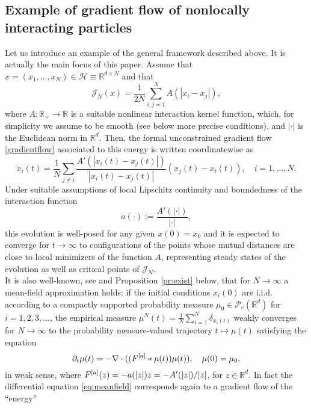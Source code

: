 \subsection{Example of gradient flow of nonlocally interacting particles}\label{sec:gradflow}
Let us introduce an example of the general framework described above. It is actually the main focus of this paper.
Assume that $x=(x_1,\dots,x_N) \in \mathcal H \equiv  \mathbb R^{d\times N}$ and that 
$$
\mathcal J_N(x) = \frac{1}{2N} \sum_{i,j=1}^N A(| x_i -  x_j |),
$$
where $A:\mathbb R_+ \to \mathbb R$ is a suitable nonlinear interaction kernel function, which, for simplicity we assume to be smooth (see below more precise conditions), and $|\cdot|$ is the Euclidean norm in $\mathbb R^d$. Then, the formal unconstrained gradient flow \eqref{gradientflow} associated to this energy is written coordinatewise as
\begin{equation}\label{fdgradientflow}
\dot x_i(t) = \frac{1}{N} \sum_{j \neq i} \frac{A'(| x_i(t) -  x_j(t) |)}{| x_i(t) -  x_j(t) |} (x_j(t) - x_i(t)), \quad i=1,\dots,N.
\end{equation}
Under suitable assumptions of local Lipschitz continuity and boundedness of the interaction function
\begin{equation}\label{intker}
a(\cdot) := \frac{A'(|\cdot|)}{| \cdot |},
\end{equation} this evolution is well-posed for any given $x(0)=x_0$ and it is expected to converge for $t \to \infty$ to configurations of the points whose mutual distances are close to local minimizers of the function $A$, representing steady states of the evolution as well as critical points of $\mathcal J_N$.\\
It is also well-known, see \cite{AGS} and Proposition \ref{pr:exist} below, that for $N \to \infty$ a mean-field approximation holds: if the initial conditions $x_i(0)$ are i.i.d. according to a compactly supported probability measure $\mu_0 \in \mathcal P_c(\mathbb R^d)$ for $i=1,2,3, \dots$, the empirical measure $\mu^N(t) = \frac{1}{N} \sum_{i=1}^N \delta_{x_i(t)}$ weakly converges for $N \to \infty$  to the probability measure-valued trajectory $t \mapsto \mu(t)$ satisfying  the equation
\begin{equation}\label{eq:meanfield}
\partial_t \mu(t) = - \nabla \cdot ((F^{[a]} * \mu(t)) \mu(t)), \quad \mu(0)=\mu_0,
\end{equation}
in weak sense, 
where $F^{[a]}(z) =-a(|z|)z=-A'(|z|)/|z|$, for $z \in \mathbb R^{d}$. In fact the differential equation \eqref{eq:meanfield} corresponds again to a gradient flow of the ``energy''
